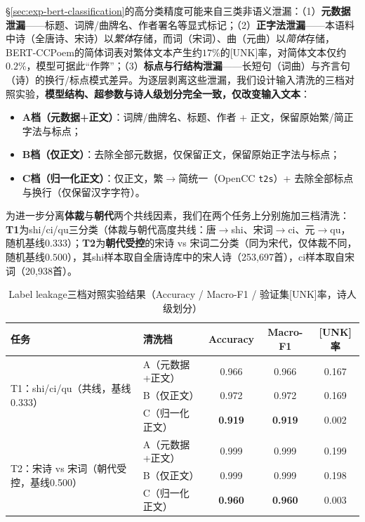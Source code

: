 \documentclass[12pt,a4paper]{article}
\numberwithin{equation}{section}
\begin{document}
\S\ref{sec:exp-bert-classification}的高分类精度可能来自三类非语义泄漏：（1）\textbf{元数据泄漏}——标题、词牌/曲牌名、作者署名等显式标记；（2）\textbf{正字法泄漏}——本语料中诗（全唐诗、宋诗）以\emph{繁体}存储，而词（宋词）、曲（元曲）以\emph{简体}存储，BERT-CCPoem的简体词表对繁体文本产生约$17\%$的[UNK]率，对简体文本仅约$0.2\%$，模型可据此“作弊”；（3）\textbf{标点与行结构泄漏}——长短句（词曲）与齐言句（诗）的换行/标点模式差异。为逐层剥离这些泄漏，我们设计输入清洗的三档对照实验，\textbf{模型结构、超参数与诗人级划分完全一致，仅改变输入文本}：

\begin{itemize}
  \item \textbf{A档（元数据+正文）}：词牌/曲牌名、标题、作者 + 正文，保留原始繁/简正字法与标点；
  \item \textbf{B档（仅正文）}：去除全部元数据，仅保留正文，保留原始正字法与标点；
  \item \textbf{C档（归一化正文）}：仅正文，繁$\rightarrow$简统一（OpenCC \texttt{t2s}）+ 去除全部标点与换行（仅保留汉字字符）。
\end{itemize}

为进一步分离\textbf{体裁}与\textbf{朝代}两个共线因素，我们在两个任务上分别施加三档清洗：\textbf{T1}为shi/ci/qu三分类（体裁与朝代高度共线：唐$\to$shi、宋词$\to$ci、元$\to$qu，随机基线$0.333$）；\textbf{T2}为\textbf{朝代受控}的宋诗 vs 宋词二分类（同为宋代，仅体裁不同，随机基线$0.500$），其shi样本取自全唐诗库中的宋人诗（253,697首），ci样本取自宋词（20,938首）。

\begin{table}[htbp]
  \centering
  \caption{Label leakage三档对照实验结果（Accuracy / Macro-F1 / 验证集[UNK]率，诗人级划分）}
  \label{tab:leakage}
  \begin{tabular}{llccc}
    \toprule
    任务 & 清洗档 & Accuracy & Macro-F1 & [UNK]率 \\
    \midrule
    \multirow{3}{*}{T1：shi/ci/qu（共线，基线0.333）}
      & A（元数据+正文）   & 0.966 & 0.966 & 0.167 \\
      & B（仅正文）        & 0.972 & 0.972 & 0.169 \\
      & C（归一化正文）    & \textbf{0.919} & \textbf{0.919} & 0.002 \\
    \midrule
    \multirow{3}{*}{T2：宋诗 vs 宋词（朝代受控，基线0.500）}
      & A（元数据+正文）   & 0.999 & 0.999 & 0.199 \\
      & B（仅正文）        & 0.999 & 0.999 & 0.198 \\
      & C（归一化正文）    & \textbf{0.960} & \textbf{0.960} & 0.003 \\
    \bottomrule
  \end{tabular}
\end{table}
\end{document}
